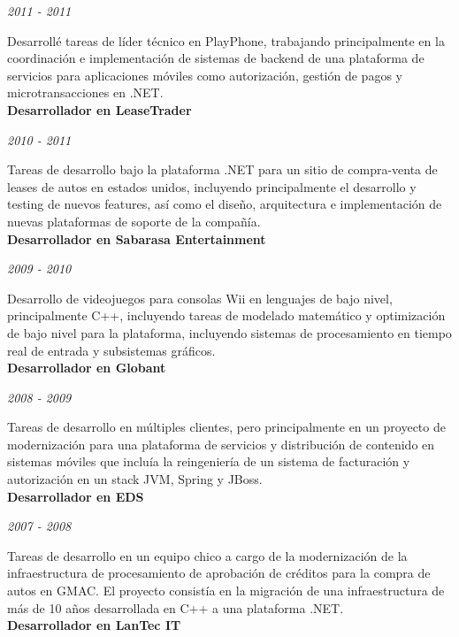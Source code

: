 \documentclass[a4paper,11pt]{article}
\begin{document}
\noindent \emph{2011 - 2011}

\noindent Desarrollé tareas de líder técnico en PlayPhone, trabajando
principalmente en la coordinación e implementación de sistemas de backend de
una plataforma de servicios para aplicaciones móviles como autorización,
gestión de pagos y microtransacciones en .NET. \\

\noindent \textbf{Desarrollador en LeaseTrader}

\noindent \emph{2010 - 2011}

\noindent Tareas de desarrollo bajo la plataforma .NET para un sitio de
compra-venta de leases de autos en estados unidos, incluyendo principalmente el
desarrollo y testing de nuevos features, así como el diseño, arquitectura e
implementación de nuevas plataformas de soporte de la compañía. \\

\noindent \textbf{Desarrollador en Sabarasa Entertainment}

\noindent \emph{2009 - 2010}

\noindent Desarrollo de videojuegos para consolas Wii en lenguajes de bajo
nivel, principalmente C++, incluyendo tareas de modelado matemático y
optimización de bajo nivel para la plataforma, incluyendo sistemas de
procesamiento en tiempo real de entrada y subsistemas gráficos. \\

\noindent \textbf{Desarrollador en Globant}

\noindent \emph{2008 - 2009}

\noindent Tareas de desarrollo en múltiples clientes, pero principalmente en un
proyecto de modernización para una plataforma de servicios y distribución de
contenido en sistemas móviles que incluía la reingeniería de un sistema de
facturación y autorización en un stack JVM, Spring y JBoss. \\

\noindent \textbf{Desarrollador en EDS}

\noindent \emph{2007 - 2008}

\noindent Tareas de desarrollo en un equipo chico a cargo de la modernización
de la infraestructura de procesamiento de aprobación de créditos para la compra
de autos en GMAC. El proyecto consistía en la migración de una infraestructura
de más de 10 años desarrollada en C++ a una plataforma .NET. \\

\noindent \textbf{Desarrollador en LanTec IT}
\end{document}
